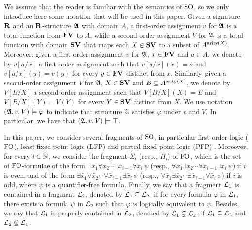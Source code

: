 We assume that the reader is familiar with the semantics of ${\rm SO}$, so we only introduce here some notation that will be used in this paper. 
Given a signature $\mathbf{R}$ and an $\mathbf{R}$-structure $\mathfrak{A}$ with domain $A$, a first-order assignment $v$ for $\mathfrak{A}$ is a total function from $\mathbf{FV}$ to $A$, while a second-order assignment $V$ for $\mathfrak{A}$ is a total function with domain $\mathbf{SV}$ that maps each $X \in \mathbf{SV}$ to a subset of $A^{{\rm arity}(X)}$. Moreover, given a first-order assignment $v$ for $\mathfrak{A}$, $x \in \mathbf{FV}$ and $a \in A$, we denote by $v[a/x]$ a first-order assignment such that $v[a/x](x) = a$ and $v[a/x](y) = v(y)$ for every $y \in \mathbf{FV}$ distinct from $x$. Similarly, given a second-order assignment $V$ for $\mathfrak{A}$, $X \in \mathbf{SV}$ and $B  \subseteq A^{{\rm arity}(X)}$, we denote by $V[B/X]$ a second-order assignment such that $V[B/X](X) = B$ and $V[B/X](Y) = V(Y)$ for every $Y \in \mathbf{SV}$ distinct from $X$. We use notation $(\mathfrak{A}, v, V) \models \varphi$ to indicate that structure $\mathfrak{A}$ satisfies $\varphi$ under $v$ and $V$. In particular, we have that $(\mathfrak{A}, v, V) \models \top$.

In this paper, we consider several fragments of ${\rm SO}$, in particular first-order logic (${\rm FO}$), least fixed point logic (LFP) and partial fixed point logic (PFP) \cite{L04}. Moreover, for every $i \in \mathbb{N}$, we consider the fragment $\Sigma_i$ (resp., $\Pi_i$) of ${\rm FO}$, which is the set of ${\rm FO}$-formulae of the form 
$\exists \bar x_1 \forall \bar x_2 \cdots \exists \bar x_{i-1} \forall \bar x_{i} \, \psi$ (resp., 
$\forall \bar x_1 \exists \bar x_2 \cdots \forall \bar x_{i-1} \exists \bar x_{i} \, \psi$) if $i$ is even, and of the form
$\exists \bar x_1 \forall \bar x_2 \cdots \forall \bar x_{i-1} \exists \bar x_{i} \, \psi$ (resp., 
$\forall \bar x_1 \exists \bar x_2 \cdots \exists \bar x_{i-1} \forall \bar x_{i} \, \psi$) if $i$ is odd, where $\psi$ is a quantifier-free formula. Finally, we say that a fragment $\mathcal{L}_1$ is contained in a fragment $\mathcal{L}_2$, denoted by $\mathcal{L}_1 \subseteq \mathcal{L}_2$, if for every formula $\varphi$ in $\mathcal{L}_1$, there exists a formula $\psi$ in $\mathcal{L}_2$ such that $\varphi$ is logically equivalent to $\psi$.  Besides, we say that $\mathcal{L}_1$ is properly contained in $\mathcal{L}_2$, denoted by $\mathcal{L}_1 \subsetneq \mathcal{L}_2$, if $\mathcal{L}_1 \subseteq \mathcal{L}_2$ and $\mathcal{L}_2 \not\subseteq \mathcal{L}_1$.


